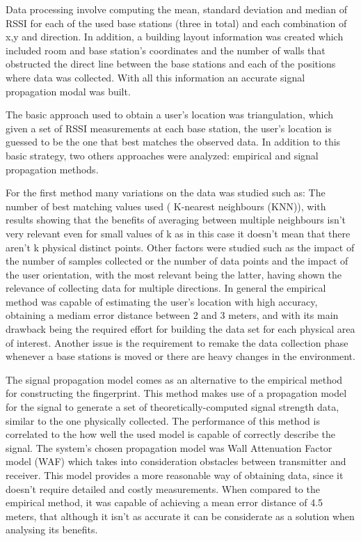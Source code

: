 Data processing involve computing the mean, standard deviation and median of \ac{RSSI} for each of the used base stations (three in total) and each combination of x,y and direction. In addition, a building layout information was created which included room and base station's coordinates and the number of walls that obstructed the direct line between the base stations and each of the positions where data was collected. With all this information an accurate signal propagation modal was built.

The basic approach used to obtain a user's location was triangulation, which given a set of \ac{RSSI} measurements at each base station, the user's location is guessed to be the one that best matches the observed data. In addition to this basic strategy, two others approaches were analyzed: empirical and signal propagation methods. 

For the first method many variations on the data was studied such as: The number of best matching values used ( K-nearest neighbours (KNN)), with results showing that the benefits of averaging between multiple neighbours isn't very relevant even for small values of k as in this case it doesn't mean that there aren't k physical distinct points. Other factors were studied such as the impact of the number of samples collected or the number of data points and the impact of the user orientation, with the most relevant being the latter, having shown the relevance of collecting data for multiple directions. In general the empirical method was capable of estimating the user's location with high accuracy, obtaining a mediam error distance between 2 and 3 meters, and with its main drawback being the required effort for building the data set for each physical area of interest. Another issue is the requirement to remake the data collection phase whenever a base stations is moved or there are heavy changes in the environment.

The signal propagation model comes as an alternative to the empirical method for constructing the fingerprint. This method makes use of a propagation model for the signal to generate a set of theoretically-computed signal strength data, similar to the one physically collected. The performance of this method is correlated to the how well the used model is capable of correctly describe the signal. The system's chosen propagation model was Wall Attenuation Factor model (WAF) which takes into consideration obstacles between transmitter and receiver. This model provides a more reasonable way of obtaining data, since it doesn't require detailed and costly measurements. When compared to the empirical method, it was capable of achieving a mean error distance of 4.5 meters, that although it isn't as accurate it can be considerate as a solution when analysing its benefits.


